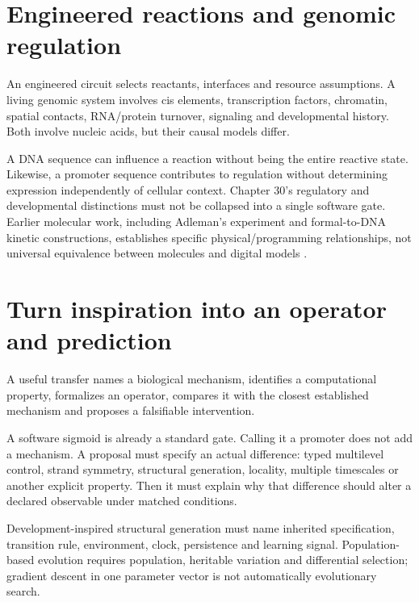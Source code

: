 \section{Engineered reactions and genomic regulation}
An engineered circuit selects reactants, interfaces and resource assumptions.
A living genomic system involves cis elements, transcription factors, chromatin,
spatial contacts, RNA/protein turnover, signaling and developmental history.
Both involve nucleic acids, but their causal models differ.

A DNA sequence can influence a reaction without being the entire reactive state.
Likewise, a promoter sequence contributes to regulation without determining
expression independently of cellular context. Chapter 30's regulatory and
developmental distinctions must not be collapsed into a single software gate.
Earlier molecular work, including Adleman's experiment and formal-to-DNA
kinetic constructions, establishes specific physical/programming relationships,
not universal equivalence between molecules and digital models
\cite{Adleman1994,Soloveichik2010}.

\section{Turn inspiration into an operator and prediction}
A useful transfer names a biological mechanism, identifies a computational
property, formalizes an operator, compares it with the closest established
mechanism and proposes a falsifiable intervention.

A software sigmoid is already a standard gate. Calling it a promoter does not
add a mechanism. A proposal must specify an actual difference: typed multilevel
control, strand symmetry, structural generation, locality, multiple timescales
or another explicit property. Then it must explain why that difference should
alter a declared observable under matched conditions.

Development-inspired structural generation must name inherited specification,
transition rule, environment, clock, persistence and learning signal.
Population-based evolution requires population, heritable variation and
differential selection; gradient descent in one parameter vector is not
automatically evolutionary search.

